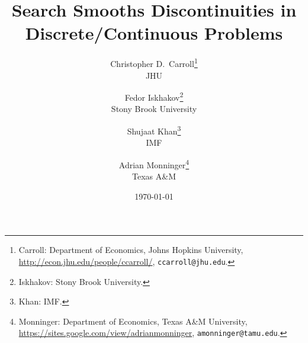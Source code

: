 \title{Search Smooths Discontinuities in\\ Discrete/Continuous Problems}

\author{
Christopher D.\ Carroll\thanks{Carroll: Department of Economics, Johns Hopkins University,
\url{http://econ.jhu.edu/people/ccarroll/}, \texttt{ccarroll@jhu.edu}.}\\
JHU
\and
Fedor Iskhakov\thanks{Iskhakov: Stony Brook University.}\\
Stony Brook University
\and
Shujaat Khan\thanks{Khan: IMF.}\\
IMF
\and
Adrian Monninger\thanks{Monninger: Department of Economics, Texas A\&M University, \url{https://sites.google.com/view/adrianmonninger}, \texttt{amonninger@tamu.edu}.}\\
Texas A\&M
}

\date{\today}

\maketitle

